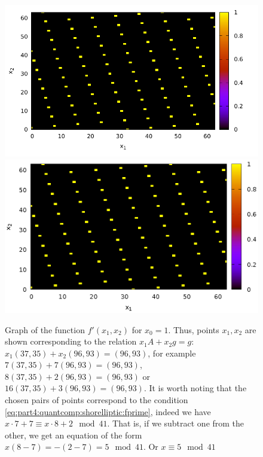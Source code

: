 \begin{figure}
\centering

\ifpdf
\includegraphics[angle=0]
{./part4/quantcomp/picellipticdiscretlog1.pdf}
\else
\includegraphics[angle=0]
{./part4/quantcomp/picellipticdiscretlog1.eps}
\fi

%




\caption{Graph of the function 
$f'(x_1, x_2)$ for $x_0 = 1$. Thus, points $x_1, x_2$ are shown
  corresponding to the relation $x_1 A + x_2 g = g$: 
  $x_1 (37, 35) + x_2 (96,93) = (96,93)$, for example
  $7 (37, 35) + 7 (96,93) = (96,93)$, $8 (37, 35) + 2 (96,93) =
  (96,93)$ or $16 (37, 35) + 3 (96,93) =
  (96,93)$. It is worth noting that the chosen pairs of points correspond
  to the condition \eqref{eq:part4:quantcomp:shorelliptic:fprime}, indeed
 we have $x \cdot 7 + 7 \equiv x \cdot 8 + 2 \mod 41$. 
 That is, if we subtract one from the other, we
 get an equation of the form $x \left(8-7\right) = - (2 - 7) = 5 \mod 41$.
 Or $x \equiv 5 \mod 41$} 
\label{fig:part4:quantcomp:dle1}
\end{figure}